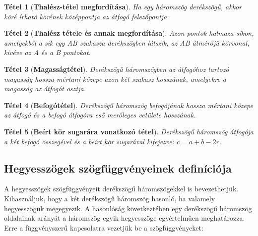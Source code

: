 \documentclass[12pt,a4paper]{article}
\newtheorem{theorem}{Tétel} [section]
\begin{document}
\begin{theorem}[\textbf{Thalész-tétel megfordítása}]
Ha egy háromszög derékszögű, akkor köré írható körének középpontja az átfogó felezőpontja.
\end{theorem}
\begin{theorem}[\textbf{Thalész tétele és annak megfordítása}]
Azon pontok halmaza síkon, amelyekből a sík egy AB szakasza derékszögben látszik, az AB átmérőjű körvonal, kivéve az A és a B pontokat.
\end{theorem}
\begin{theorem}[\textbf{Magasságtétel}]
Derékszögű háromszögben az átfogóhoz tartozó magasság hossza mértani közepe azon két szakasz hosszának, amelyekre a magasság az átfogót osztja.
\end{theorem}
\begin{theorem}[\textbf{Befogótétel}]
Derékszögű háromszög befogójának hossza mértani közepe az átfogó és a befogó átfogóra eső merőleges vetülete hosszának.
\end{theorem}
\begin{theorem}[\textbf{Beírt kör sugarára vonatkozó tétel}]
Derékszögű háromszög átfogója a két befogó összegével és a beírt kör sugarával kifejezve: $c = a + b - 2r$.
\end{theorem}

\subsection{Hegyesszögek szögfüggvényeinek definíciója}
A hegyesszögek szögfüggvényeit derékszögű háromszögekkel is bevezethetjük. Kihasználjuk, hogy a két derékszögű háromszög hasonló, ha valamely hegyesszögük megegyezik. A hasonlóság következtében egy derékszögű háromszög oldalainak arányát a háromszög egyik hegyesszöge egyértelműen meghatározza. Erre a függvényszerű kapcsolatra vezetjük be a szögfüggvényeket:
\end{document}
